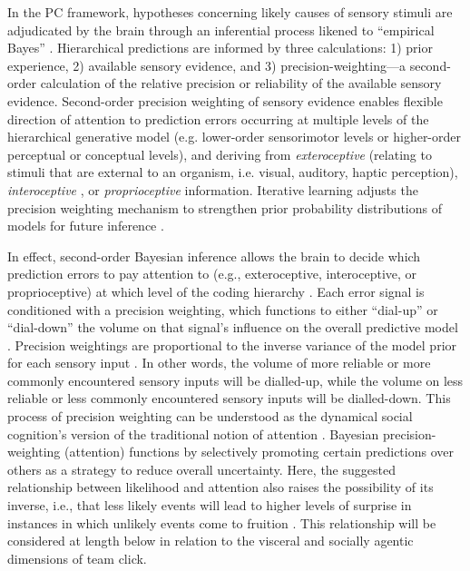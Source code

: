\begin{CJK}{UTF8}{gbsn}
In the PC framework, hypotheses concerning likely causes of sensory stimuli are adjudicated by the brain through an inferential process likened to ``empirical Bayes'' \citep{Clark2013}.  Hierarchical predictions are informed by three calculations: 1) prior experience, 2) available sensory evidence, and 3) precision-weighting---a second-order calculation of the relative precision or reliability of the available sensory evidence.  Second-order precision weighting of sensory evidence enables flexible direction of attention to prediction errors occurring at multiple levels of the hierarchical generative model (e.g. lower-order sensorimotor levels or higher-order perceptual or conceptual levels), and deriving from \textit{exteroceptive} (relating to stimuli that are external to an organism, i.e. visual, auditory, haptic perception), \textit{interoceptive} \citep[relating to stimuli produced within an organism, particularly by the body's organs (viscera) e.g., ``gut feelings,'' or elevated heart rate; see][]{Seth2013,FeldmanBarrett2015}, or \textit{proprioceptive} \citep[relating to stimuli that are produced and perceived within an organism, especially those connected with the position and movement of the body; see][]{Friston2011a} information.  Iterative learning adjusts the precision weighting mechanism to strengthen prior probability distributions of models for future inference \citep{Robbins1964}.

In effect, second-order Bayesian inference allows the brain to decide which prediction errors to pay attention to (e.g., exteroceptive, interoceptive, or proprioceptive) at which level of the coding hierarchy \citep[for example, higher conceptual errors or lower sensorimotor errors][]{Friston2015}.  Each error signal is conditioned with a precision weighting, which functions to either ``dial-up'' or ``dial-down'' the volume on that signal's influence on the overall predictive model \citep{Clark2015}.  Precision weightings are proportional to the inverse variance of the model prior for each sensory input \citep{Ernst2004,FitzGerald2014}.  In other words, the volume of more reliable or more commonly encountered sensory inputs will be dialled-up, while the volume on less reliable or less commonly encountered sensory inputs will be dialled-down. This process of precision weighting can be understood as the dynamical social cognition's version of the traditional notion of attention \citep{Ramstead2016}. Bayesian precision-weighting (attention) functions by selectively promoting certain predictions over others as a strategy to reduce overall uncertainty.
Here, the suggested relationship between likelihood and attention also raises the possibility of its inverse, i.e., that less likely events will lead to higher levels of surprise in instances in which unlikely events come to fruition \citep{Chetverikov2016}.  This relationship will be considered at length below in relation to the visceral and socially agentic dimensions of team click.


\end{CJK}
